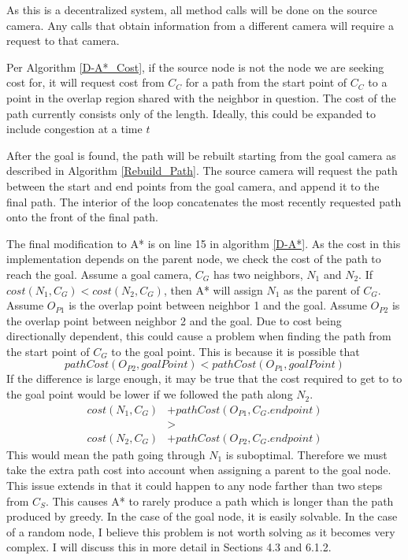 As this is a decentralized system, all method calls will be done on the source camera. Any calls that obtain information from a different camera will require a request to that camera. 

Per Algorithm \ref{D-A*_Cost}, if the source node is not the node we are seeking cost for, it will request cost from $C_C$ for a path from the start point of $C_C$ to a point in the overlap region shared with the neighbor in question. The cost of the path currently consists only of the length. Ideally, this could be expanded to include congestion at a time \(t\)

After the goal is found, the path will be rebuilt starting from the goal camera as described in Algorithm \ref{Rebuild_Path}. The source camera will request the path between the start and end points from the goal camera, and append it to the final path. The interior of the loop concatenates the most recently requested path onto the front of the final path. 


The final modification to A* is on line 15 in algorithm \ref{D-A*}. As the cost in this implementation depends on the parent node, we check the cost of the path to reach the goal. Assume a goal camera, $C_G$ has two neighbors, $N_1$ and $N_2$. If $cost(N_1, C_G) < cost(N_2, C_G)$, then A* will assign $N_1$ as the parent of $C_G$.  Assume $O_{P1}$ is the overlap point between neighbor 1 and the goal. Assume $O_{P2}$ is the overlap point between neighbor 2 and the goal. Due to cost being directionally dependent, this could cause a problem when finding the path from the start point of $C_G$ to the goal point. This is because it is possible that $$pathCost(O_{P2}, goalPoint) < pathCost(O_{P1}, goalPoint)$$ If the difference is large enough, it may be true that the cost required to get to to the goal point would be lower if we followed the path along $N_2$.
\begin{align*}
	cost(N_1, C_G) &+ pathCost(O_{P1}, C_G.endpoint) \\
	&> \\
	cost(N_2, C_G) &+ pathCost(O_{P2}, C_G.endpoint)
\end{align*}
This would mean the path going through $N_1$ is suboptimal. Therefore we must take the extra path cost into account when assigning a parent to the goal node. This issue extends in that it could happen to any node farther than two steps from $C_S$. This causes A* to rarely produce a path which is longer than the path produced by greedy. In the case of the goal node, it is easily solvable. In the case of a random node, I believe this problem is not worth solving as it becomes very complex. I will discuss this in more detail in Sections 4.3 and 6.1.2.


